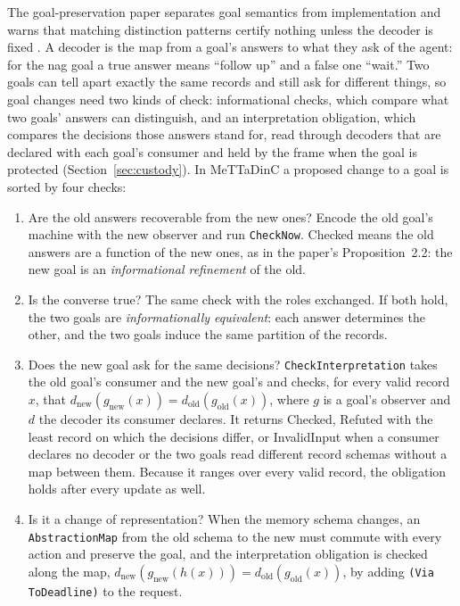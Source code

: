 \documentclass[11pt]{article}
\newcommand{\code}[1]{\texttt{#1}}
\theoremstyle{definition}
\theoremstyle{plain}
\begin{document}
The goal-preservation paper separates goal semantics from implementation and warns that matching
distinction patterns certify nothing unless the decoder is fixed \cite{goalpres}. A decoder is the
map from a goal's answers to what they ask of the agent: for the nag goal a true answer means
``follow up'' and a false one ``wait.'' Two goals can tell apart exactly the same records and still
ask for different things, so goal changes need two kinds of check: informational checks, which
compare what two goals' answers can distinguish, and an interpretation obligation, which compares
the decisions those answers stand for, read through decoders that are declared with each goal's
consumer and held by the frame when the goal is protected (Section~\ref{sec:custody}). In MeTTaDinC a
proposed change to a goal is sorted by four checks:
\begin{enumerate}
\item Are the old answers recoverable from the new ones? Encode the old goal's machine with the new
  observer and run \code{CheckNow}. Checked means the old answers are a function of the new ones,
  as in the paper's Proposition~2.2: the new goal is an \emph{informational refinement} of the old.
\item Is the converse true? The same check with the roles exchanged. If both hold, the two goals
  are \emph{informationally equivalent}: each answer determines the other, and the two goals induce
  the same partition of the records.
\item Does the new goal ask for the same decisions? \code{CheckInterpretation} takes the old goal's
  consumer and the new goal's and checks, for every valid record $x$, that
  $d_{\mathrm{new}}(g_{\mathrm{new}}(x))=d_{\mathrm{old}}(g_{\mathrm{old}}(x))$, where $g$ is a
  goal's observer and $d$ the decoder its consumer declares. It returns Checked, Refuted with the
  least record on which the decisions differ, or InvalidInput when a consumer declares no decoder
  or the two goals read different record schemas without a map between them. Because it ranges
  over every valid record, the obligation holds after every update as well.
\item Is it a change of representation? When the memory schema changes, an \code{AbstractionMap}
  from the old schema to the new must commute with every action and preserve the goal, and the
  interpretation obligation is checked along the map, $d_{\mathrm{new}}(g_{\mathrm{new}}(h(x)))=
  d_{\mathrm{old}}(g_{\mathrm{old}}(x))$, by adding \code{(Via ToDeadline)} to the request.
\end{enumerate}
\end{document}
